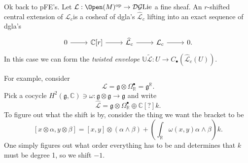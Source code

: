 Ok back to pFE's. Let $\mathcal{L} : \Open(M) ^{\mathrm{op}}  \to \mathcal{D} \mathcal{G} \mathrm{Lie} $ a fine sheaf. An $r$-shifted central extension of $\mathcal{L} _c$is a cosheaf of dgla's $\widehat{\mathcal{L} }_c$ lifting into an exact sequence of dgla's
\[\begin{tikzcd}[row sep = 2.5em, column sep = 2.5em]
	0\ar[r]  & \mathbb{C} [r]\ar[r]  & \widehat{\mathcal{L} }_c\ar[r]  & \mathcal{L} _c\ar[r]  & 0.
\end{tikzcd}\]
In this case we can form the \emph{twisted envelope} $\mathbb{U} \widetilde{\mathcal{L} }: U \to C_{\bullet} (\widehat{\mathcal{L} }_c(U))$.

For example, consider
\[
	\mathcal{L} =\mathfrak{g} \otimes \Omega _\mathbb{R} ^{\bullet} =\mathfrak{g} ^\mathbb{R} 
.\]
Pick a cocycle $H^2(\mathfrak{g} ,\mathbb{C} )\ni\omega : \mathfrak{g} \otimes \mathfrak{g}  \to \mathfrak{g} $ and write
\[
	\widehat{\mathcal{L} }=\mathfrak{g} \otimes \Omega ^{\bullet} _\mathbb{R} \oplus \mathbb{C} [?]k
.\]
To figure out what the shift is by, consider the thing we want the bracket to be
\[
	[x\otimes \alpha ,y\otimes \beta ]=[x,y]\otimes (\alpha \wedge \beta )+\left(\int_\mathbb{R} \omega (x,y)\alpha \wedge \beta \right)k
.\]
One simply figures out what order everything has to be and determines that $k$ must be degree 1, so we shift $-1$.
